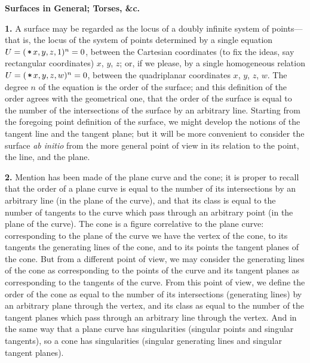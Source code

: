 \documentclass[11pt,a4paper]{article}
\begin{document}
\bigskip
\noindent\textbf{Surfaces in General; Torses, \&c.}

\smallskip

\textbf{1.}\quad
A surface may be regarded as the locus of a doubly infinite system of points---that is, the locus of the system of points determined by a single equation $U = (\,\raisebox{0.15ex}{\ensuremath{*\!\!\!*}}\, x, y, z, 1)^{n} = 0$, between the Cartesian coordinates (to fix the ideas, say rectangular coordinates) $x$, $y$, $z$; or, if we please, by a single homogeneous relation $U = (\,\raisebox{0.15ex}{\ensuremath{*\!\!\!*}}\, x, y, z, w)^{n} = 0$, between the quadriplanar coordinates $x$, $y$, $z$, $w$. The degree $n$ of the equation is the order of the surface; and this definition of the order agrees with the geometrical one, that the order of the surface is equal to the number of the intersections of the surface by an arbitrary line. Starting from the foregoing point definition of the surface, we might develop the notions of the tangent line and the tangent plane; but it will be more convenient to consider the surface \textit{ab initio} from the more general point of view in its relation to the point, the line, and the plane.

\textbf{2.}\quad
Mention has been made of the plane curve and the cone; it is proper to recall that the order of a plane curve is equal to the number of its intersections by an arbitrary line (in the plane of the curve), and that its class is equal to the number of tangents to the curve which pass through an arbitrary point (in the plane of the curve). The cone is a figure correlative to the plane curve: corresponding to the plane of the curve we have the vertex of the cone, to its tangents the generating lines of the cone, and to its points the tangent planes of the cone. But from a different point of view, we may consider the generating lines of the cone as corresponding to the points of the curve and its tangent planes as corresponding to the tangents of the curve. From this point of view, we define the order of the cone as equal to the number of its intersections (generating lines) by an arbitrary plane through the vertex, and its class as equal to the number of the tangent planes which pass through an arbitrary line through the vertex. And in the same way that a plane curve has singularities (singular points and singular tangents), so a cone has singularities (singular generating lines and singular tangent planes).
\end{document}
